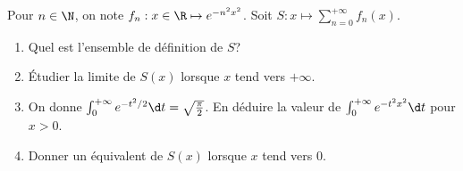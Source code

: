 \begin{enonce}
\begin{exercise}[ID={RMS133 E1315},subtitle={CCINP MP 2022},tags={},difficulty={}]
  Pour $n\in\N$, on note $f_n:x\in\R\mapsto e^{-n^2 x^2}$.
  Soit $S:x\mapsto \sum_{n=0}^{+\infty} f_n(x)$.
  \begin{enumerate}
    \item Quel est l'ensemble de définition de $S$?
    \item Étudier la limite de $S(x)$ lorsque $x$ tend vers $+\infty$.
    \item On donne $\int_0^{+\infty} e^{-t^2/2}\d t=\sqrt{\frac{\pi}{2}}$.
      En déduire la valeur de $\int_0^{+\infty} e^{-t^2 x^2} \d t$ pour $x>0$.

    \item Donner un équivalent de $S(x)$ lorsque $x$ tend vers $0$.
  \end{enumerate}
\end{exercise}
\begin{solution}
\end{solution}
\end{enonce}
